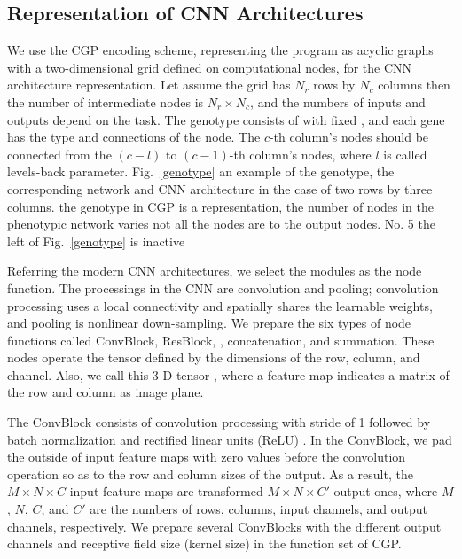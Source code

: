 \subsection{Representation of CNN Architectures}
We use the CGP encoding scheme, representing the program as  acyclic graphs with a two-dimensional grid defined on computational nodes, for the CNN architecture representation. Let  assume  the grid has $N_r$ rows by $N_c$ columns\new{;} then the number of intermediate nodes is $N_r \times N_c$, and the numbers of inputs and outputs depend on the task. The genotype consists of  with fixed , and each gene has   the type and connections of the node. The $c$-th column's nodes should be connected from the $(c-l)$ to $(c-1)$-th column's nodes, where $l$ is called  levels-back parameter. Fig.~\ref{genotype}  an example of the genotype, the corresponding network\new{,} and  CNN architecture in the case of two rows by three columns.  the genotype in CGP is a  representation, the number of nodes in the phenotypic network varies  not all  the nodes are  to the output nodes.  No. 5  the left  of Fig.~\ref{genotype} is  inactive 

Referring  the modern CNN architectures, we select the  modules as the node function.
The  processings in the CNN are convolution and pooling; convolution processing uses a local connectivity and spatially shares the learnable weights, and pooling is nonlinear down-sampling.
We prepare the six types of node functions called ConvBlock, ResBlock, , concatenation, and summation.
These nodes operate the  tensor defined by the dimensions of the row, column, and channel. Also, we call this 3-D tensor , where a feature map indicates a matrix of the row and column as  image plane.

The ConvBlock consists of  convolution processing with  stride of 1 followed by batch normalization \cite{ioffe_batch_2015} and rectified linear units (ReLU) \cite{nair_rectified_2010}. In the ConvBlock, we pad the outside of input feature maps with zero values before the convolution operation so as to  the row and column sizes of the output. 
As a result, the $M \times N \times C$ input feature maps are transformed  $M \times N \times C'$ output ones, where $M$, $N$, $C$, and $C'$ are the numbers of rows, columns, input channels, and output channels, respectively.
We prepare several ConvBlocks with the different output channels and  receptive field size (kernel size) in the function set of CGP.

